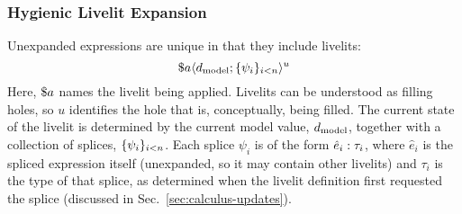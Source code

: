 \subsubsection{Hygienic Livelit Expansion}
Unexpanded expressions are unique in that they include livelits:
 \[\haplivelit{u}{a}{\dtxt{model}}{\splices}\] 
Here, $\livelitname{a}$ names the livelit 
 being applied. Livelits can be understood as filling holes, so $u$ identifies the hole
 that is, conceptually, being filled. 
The current state of the livelit is determined by the current model value, $\dtxt{model}$, 
together with a collection of splices, $\splices$. Each splice $\psi_i$ 
is of the form $\hsplice{\hat e_i}{\tau_i}$, where $\hat e_i$ is the spliced expression 
itself (unexpanded, so it may contain other livelits) and $\tau_i$ is the type of that splice,
as determined when the livelit definition first requested the splice (discussed in Sec.~\ref{sec:calculus-updates}).

